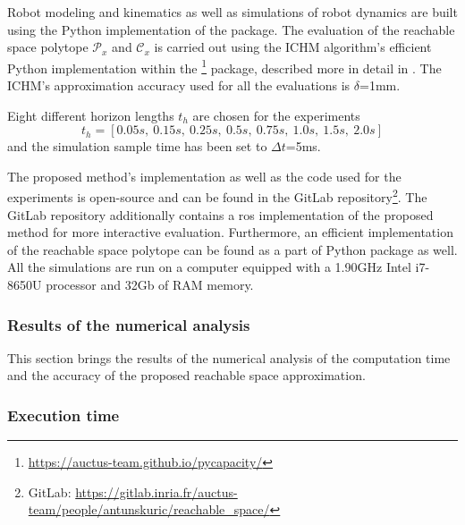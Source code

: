 Robot modeling and kinematics as well as simulations of robot dynamics are built using the Python implementation of the  \cite{rtb} package. 
The evaluation of the reachable space polytope $\mathcal{P}_x$ and $\mathcal{C}_x$ is carried out using the ICHM algorithm's efficient Python implementation within the \footnote{\url{https://auctus-team.github.io/pycapacity/}} package, described more in detail in . The ICHM's approximation accuracy used for all the evaluations is $\delta$=1mm.

Eight different horizon lengths $t_h$ are chosen for the experiments
$$
t_h = [0.05s, ~ 0.15s, ~ 0.25s, ~ 0.5s,~ 0.75s,~ 1.0s,~ 1.5s, ~ 2.0s]
$$
and the simulation sample time has been set to $\Delta t$=5ms. 

The proposed method's implementation as well as the code used for the experiments is open-source and can be found in the GitLab repository\footnote{GitLab: \url{https://gitlab.inria.fr/auctus-team/people/antunskuric/reachable_space/}}. The GitLab repository additionally contains a \gls{ros} \cite{ros} implementation of the proposed method for more interactive evaluation. Furthermore, an efficient implementation of the reachable space polytope can be found as a part of  Python package as well. All the simulations are run on a computer equipped with a 1.90GHz Intel i7-8650U processor and 32Gb of RAM memory.
 
\subsubsection{Results of the numerical analysis}
\label{ch:results}

This section brings the results of the numerical analysis of the computation time and the accuracy of the proposed reachable space approximation.

\subsubsection*{Execution time}

